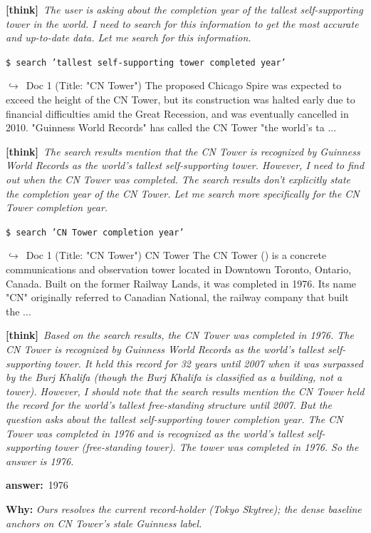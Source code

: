 \documentclass{article} %
\newcommand{\winbadge}{\colorbox{green!50!black}{\textcolor{white}{\scriptsize\bfseries\,WIN\,}}}
\newcommand{\thk}[1]{{\footnotesize\textcolor{violet!75!black}{\textbf{[think]}}\ \textit{#1}\par}}
\newcommand{\cmd}[1]{{\footnotesize\texttt{\textcolor{blue!35!black}{\$\ #1}}\par}}
\newcommand{\retr}[1]{{\footnotesize\textcolor{black!65}{\quad$\hookrightarrow$\ #1}\par}}
\newcommand{\ans}[1]{{\footnotesize\textbf{answer:}\ #1\par}}
\begin{document}
\begin{cmpbox}[label={ex:bamboogle-skytree},title={\winbadge\ \ \textsc{Bamboogle -- current vs.\ stale record-holder}}]
  \thk{The user is asking about the completion year of the tallest self-supporting tower in the world. I need to search for this information to get the most accurate and up-to-date data. Let me search for this information.}
  \cmd{search 'tallest self-supporting tower completed year'}
  \retr{Doc 1 (Title: "CN Tower") The proposed Chicago Spire was expected to exceed the height of the CN Tower, but its construction was halted early due to financial difficulties amid the Great Recession, and was eventually cancelled in 2010. "Guinness World Records" has called the CN Tower "the world's ta ...}
  \thk{The search results mention that the CN Tower is recognized by Guinness World Records as the world's tallest self-supporting tower. However, I need to find out when the CN Tower was completed. The search results don't explicitly state the completion year of the CN Tower. Let me search more specifically for the CN Tower completion year.}
  \cmd{search 'CN Tower completion year'}
  \retr{Doc 1 (Title: "CN Tower") CN Tower The CN Tower () is a concrete communications and observation tower located in Downtown Toronto, Ontario, Canada. Built on the former Railway Lands, it was completed in 1976. Its name "CN" originally referred to Canadian National, the railway company that built the ...}
  \thk{Based on the search results, the CN Tower was completed in 1976. The CN Tower is recognized by Guinness World Records as the world's tallest self-supporting tower. It held this record for 32 years until 2007 when it was surpassed by the Burj Khalifa (though the Burj Khalifa is classified as a building, not a tower). However, I should note that the search results mention the CN Tower held the record for the world's tallest free-standing structure until 2007. But the question asks about the tallest self-supporting tower completion year. The CN Tower was completed in 1976 and is recognized as the world's tallest self-supporting tower (free-standing tower). The tower was completed in 1976. So the answer is 1976.}
  \ans{1976}
\smallskip\par\textbf{Why:} \textit{Ours resolves the current record-holder (Tokyo Skytree); the dense baseline anchors on CN Tower's stale Guinness label.}
\end{cmpbox}\bigskip
\end{document}
